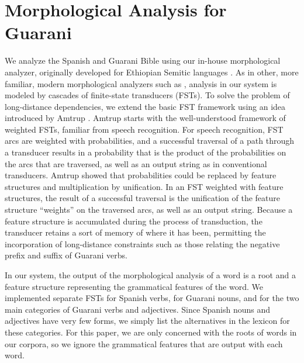 \documentclass[11pt]{article}
\begin{document}
\section{Morphological Analysis for Guarani}
\label{sec:guaranima}
We analyze the Spanish and Guarani Bible using our in-house morphological
analyzer, originally developed for Ethiopian Semitic languages 
\cite{gasser:eacl09}.
As in other, more familiar, modern
morphological analyzers such as \cite{beesley+karttunen}, analysis in our
system is modeled by cascades of finite-state transducers (FSTs).  To solve the
problem of long-distance dependencies, we extend the basic FST framework using
an idea introduced by Amtrup .  Amtrup starts with the
well-understood framework of weighted FSTs, familiar from speech recognition.
For speech recognition, FST arcs are weighted with probabilities, and a
successful traversal of a path through a transducer results in a probability
that is the product of the probabilities on the arcs that are traversed, as
well as an output string as in conventional transducers.  Amtrup showed that
probabilities could be replaced by feature structures and multiplication by
unification.  In an FST weighted with feature structures, the result of a
successful traversal is the unification of the feature structure ``weights'' on
the traversed arcs, as well as an output string.  Because a feature structure
is accumulated during the process of transduction, the transducer retains a
sort of memory of where it has been, permitting the incorporation of
long-distance constraints such as those relating the negative prefix and suffix
of Guarani verbs.

In our system, the output of the morphological analysis of a word is a root and
a feature structure representing the grammatical features of the word.  We
implemented separate FSTs for Spanish verbs, for Guarani nouns, and for the two
main categories of Guarani verbs and adjectives.  Since Spanish nouns and
adjectives have very few forms, we simply list the alternatives in the lexicon
for these categories.  For this paper, we are only concerned with the roots of
words in our corpora, so we ignore the grammatical features that are output
with each word.
\end{document}
